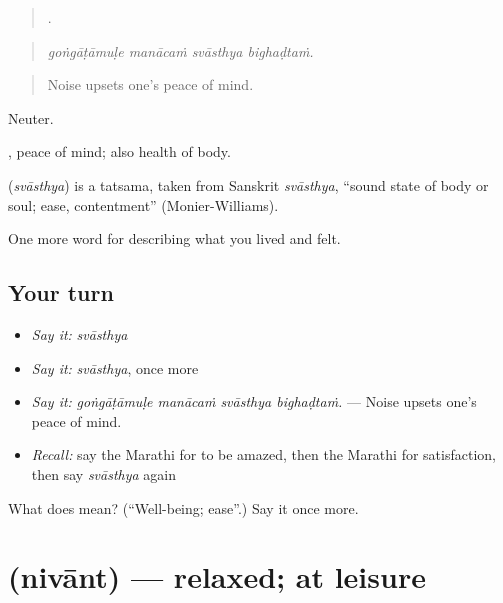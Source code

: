 \begin{quote}
   .
\end{quote}

\begin{quote}
\emph{goṅgāṭāmuḷe manācaṁ svāsthya bighaḍtaṁ.}
\end{quote}

\begin{quote}
Noise upsets one's peace of mind.
\end{quote}

Neuter.

 , peace of mind; also health of body.

\begin{cousinweb}
\textbf{} (\emph{svāsthya}) is a tatsama, taken from Sanskrit \emph{svāsthya}, \textquotedblleft{}sound state of body or soul; ease, contentment\textquotedblright{} (Monier-Williams).
\end{cousinweb}

\begin{grammarlens}[title={What you've built}]
One more word for describing what you lived and felt.
\end{grammarlens}

\subsection*{Your turn}
\begin{itemize}
\raggedright
  \item \emph{Say it:} \emph{svāsthya}
  \item \emph{Say it:} \emph{svāsthya}, once more
  \item \emph{Say it:} \emph{goṅgāṭāmuḷe manācaṁ svāsthya bighaḍtaṁ.} — Noise upsets one's peace of mind.
  \item \emph{Recall:} say the Marathi for to be amazed, then the Marathi for satisfaction, then say \emph{svāsthya} again
\end{itemize}

\begin{tcolorbox}[breakable,colback=teal!4,colframe=teal!35!black,title={Before you move on}]
What does  mean? (\textquotedblleft{}Well-being; ease\textquotedblright{}.) Say it once more.
\end{tcolorbox}
\section[\texorpdfstring{\mr{निवांत} (nivānt)}{निवांत (nivānt)}]{ (nivānt) — relaxed; at leisure}

